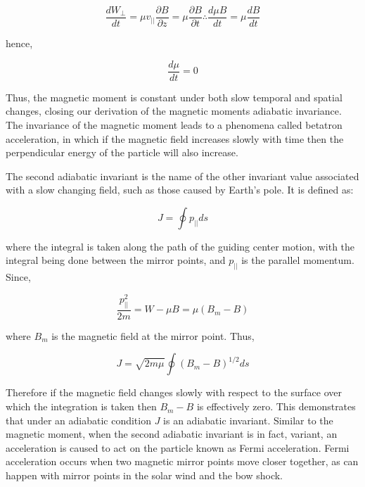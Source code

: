 \documentclass[utf8]{report}
\begin{document}
\begin{equation}
    \frac{d W_{\perp}}{dt} = \mu v_{||} \frac{\partial B}{\partial z}  = \mu \frac{\partial B}{\partial t} \therefore \frac{d \mu B}{dt} = \mu \frac{dB}{dt} 
    \label{eq:PP.AA}
\end{equation}

hence, 

\begin{equation}
    \frac{d\mu}{dt} = 0
    \label{eq:PP.BA}
\end{equation}

Thus, the magnetic moment is constant under both slow temporal and spatial changes, closing our derivation of the magnetic moments adiabatic invariance. The invariance of the magnetic moment leads to a phenomena called betatron acceleration, in which if the magnetic field increases slowly with time then the perpendicular energy of the particle will also increase. 

The second adiabatic invariant is the name of the other invariant value associated with a slow changing field, such as those caused by Earth's pole. It is defined as: 

\begin{equation}
    J = \oint p_{||} ds
    \label{eq:PP.CA}
\end{equation}

where the integral is taken along the path of the guiding center motion, with the integral being done between the mirror points, and $p_{||}$ is the parallel momentum. Since, 

\begin{equation}
    \frac{p^{2}_{||}}{2m} = W - \mu B = \mu (B_{m} - B) 
    \label{eq:PP.DA} 
\end{equation}

where $B_{m}$ is the magnetic field at the mirror point. Thus, 

\begin{equation}
    J = \sqrt{2m\mu} \oint (B_{m} - B)^{1/2} ds 
    \label{eq:PP.EA}
\end{equation}

Therefore if the magnetic field changes slowly with respect to the surface over which the integration is taken then $B_{m} - B$ is effectively zero. This demonstrates that under an adiabatic condition $J$ is an adiabatic invariant. Similar to the magnetic moment, when the second adiabatic invariant is in fact, variant, an acceleration is caused to act on the particle known as Fermi acceleration. Fermi acceleration occurs when two magnetic mirror points move closer together, as can happen with mirror points in the solar wind and the bow shock. 
\end{document}
